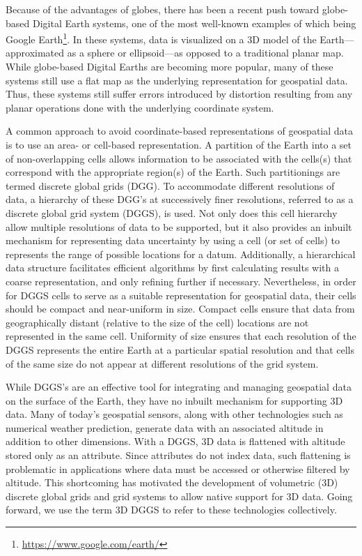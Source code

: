 Because of the advantages of globes, there has been a recent push toward globe-based Digital Earth systems, one of the most well-known examples of which being Google Earth\footnote{\url{https://www.google.com/earth/}}.
In these systems, data is visualized on a 3D model of the Earth---approximated as a sphere or ellipsoid---as opposed to a traditional planar map.
While globe-based Digital Earths are becoming more popular, many of these systems still use a flat map as the underlying representation for geospatial data.
Thus, these systems still suffer errors introduced by distortion resulting from any planar operations done with the underlying coordinate system.


A common approach to avoid coordinate-based representations of geospatial data is to use an area- or cell-based representation.
A partition of the Earth into a set of non-overlapping cells allows information to be associated with the cells(s) that correspond with the appropriate region(s) of the Earth.
Such partitionings are termed discrete global grids (DGG).
To accommodate different resolutions of data, a hierarchy of these DGG's at successively finer resolutions, referred to as a discrete global grid system (DGGS), is used.
Not only does this cell hierarchy allow multiple resolutions of data to be supported, but it also provides an inbuilt mechanism for representing data uncertainty by using a cell (or set of cells) to represents the range of possible locations for a datum.
Additionally, a hierarchical data structure facilitates efficient algorithms by first calculating results with a coarse representation, and only refining further if necessary.
Nevertheless, in order for DGGS cells to serve as a suitable representation for geospatial data, their cells should be compact and near-uniform in size.
Compact cells ensure that data from geographically distant (relative to the size of the cell) locations are not represented in the same cell.
Uniformity of size ensures that each resolution of the DGGS represents the entire Earth at a particular spatial resolution and that cells of the same size do not appear at different resolutions of the grid system.


While DGGS's are an effective tool for integrating and managing geospatial data on the surface of the Earth, they have no inbuilt mechanism for supporting 3D data.
Many of today's geospatial sensors, along with other technologies such as numerical weather prediction, generate data with an associated altitude in addition to other dimensions.
With a DGGS, 3D data is flattened with altitude stored only as an attribute.
Since attributes do not index data, such flattening is problematic in applications where data must be accessed or otherwise filtered by altitude.
This shortcoming has motivated the development of volumetric (3D) discrete global grids and grid systems to allow native support for 3D data.
Going forward, we use the term 3D DGGS to refer to these technologies collectively.


